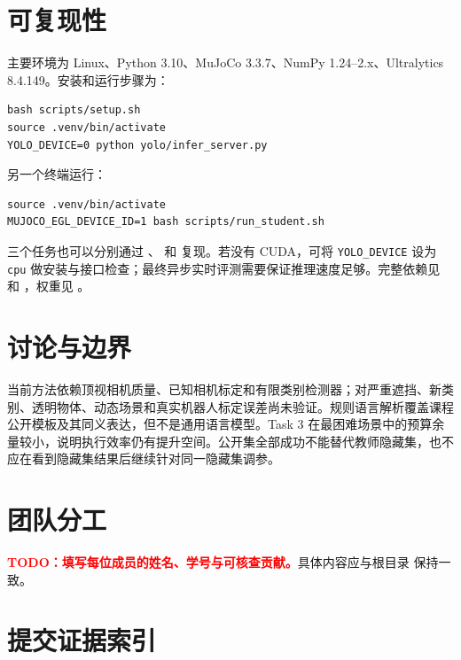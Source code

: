 \documentclass[11pt,a4paper]{ctexart}
\newcommand{\todo}[1]{\textcolor{red}{\textbf{TODO：#1}}}
\begin{document}
\section{可复现性}

主要环境为 Linux、Python 3.10、MuJoCo 3.3.7、NumPy 1.24--2.x、Ultralytics 8.4.149。安装和运行步骤为：

\begin{verbatim}
bash scripts/setup.sh
source .venv/bin/activate
YOLO_DEVICE=0 python yolo/infer_server.py
\end{verbatim}

另一个终端运行：

\begin{verbatim}
source .venv/bin/activate
MUJOCO_EGL_DEVICE_ID=1 bash scripts/run_student.sh
\end{verbatim}

三个任务也可以分别通过 、 和  复现。若没有 CUDA，可将 \texttt{YOLO\_DEVICE} 设为 \texttt{cpu} 做安装与接口检查；最终异步实时评测需要保证推理速度足够。完整依赖见  和 ，权重见 。

\section{讨论与边界}

当前方法依赖顶视相机质量、已知相机标定和有限类别检测器；对严重遮挡、新类别、透明物体、动态场景和真实机器人标定误差尚未验证。规则语言解析覆盖课程公开模板及其同义表达，但不是通用语言模型。Task 3 在最困难场景中的预算余量较小，说明执行效率仍有提升空间。公开集全部成功不能替代教师隐藏集，也不应在看到隐藏集结果后继续针对同一隐藏集调参。

\section{团队分工}

\todo{填写每位成员的姓名、学号与可核查贡献。}具体内容应与根目录  保持一致。

\section*{提交证据索引}
\end{document}
